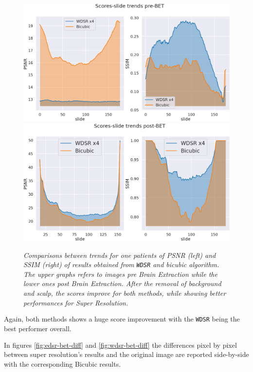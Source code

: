 \documentclass[12pt,a4paper]{report}
\begin{document}
\begin{figure}[H]
  \centering
  \includegraphics[scale=0.3]{./images/pre_bet_wdsr.png}
  \includegraphics[scale=0.3]{./images/betted_x4_slide.png}
 \caption{\it Comparisons between trends for one patients of PSNR (left) and SSIM (right) of results obtained from {\tt WDSR} and bicubic algorithm. The upper graphs refers to images pre Brain Extraction while the lower ones post Brain Extraction. After the removal of background and scalp, the scores improve for both methods, while showing better performances for Super Resolution.}
 \label{fig:pre-post-bet-2}
\end{figure}

Again, both methods shows a huge score improvement with the {\tt WDSR} being the best performer overall.

In figures \ref{fig:edsr-bet-diff} and \ref{fig:wdsr-bet-diff} the differences pixel by pixel between super resolution's results and the original image are reported side-by-side with the corresponding Bicubic results.
\end{document}
